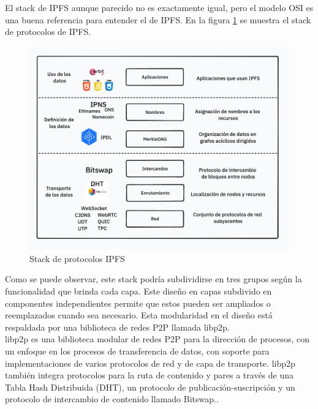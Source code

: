 El stack de IPFS aunque parecido no es exactamente igual, pero el modelo OSI es una buena referencia para entender el de IPFS.
En la figura \ref{fig:ipfs} se muestra el stack de protocolos de IPFS.

\begin{figure}[H]
      \centering
      \includegraphics[width=\linewidth]{images/ipfs-stack.png}
      \caption{Stack de protocolos IPFS}
      \label{fig:ipfs}
\end{figure}

Como se puede observar, este stack podría subdividirse en tres grupos según la funcionalidad que brinda cada capa.
Este diseño en capas subdivido en componentes independientes permite que estos pueden ser ampliados o reemplazados
cuando sea necesario. Esta modularidad en el diseño está respaldada por una biblioteca de redes P2P llamada libp2p\cite{WhatLibp2p}.
\\libp2p es una biblioteca modular de redes P2P para la dirección de procesos, con un
enfoque en los procesos de transferencia de datos, con soporte para implementaciones de varios protocolos de red y de capa de
transporte. libp2p también integra protocolos para la ruta de contenido y pares a través de una Tabla Hash Distribuida (DHT),
un protocolo de publicación-suscripción y un protocolo de intercambio de contenido llamado Bitswap.\cite{doanDecentralisedCloudStorage2022}.

